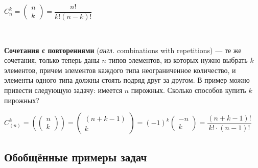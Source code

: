 \noindent $C_n^k = \begin{pmatrix} n \\ k \end{pmatrix} = \dfrac{n!}{k!(n-k)!}$

~

\textbf{Сочетания с повторениями} (\textit{англ.} combinations with repetitions) — те же сочетания, только теперь даны $n$ типов элементов, из которых нужно выбрать $k$ элементов, причем элементов каждого типа неограниченное количество, и элементы одного типа должны стоять подряд друг за другом. В пример можно привести следующую задачу: имеется $n$ пирожных. Сколько способов купить $k$ пирожных?

\noindent $C_{(n)}^k = \left( \begin{pmatrix} n \\ k \end{pmatrix} \right) = \begin{pmatrix} (n+k-1) \\ k \end{pmatrix} = (-1)^k\begin{pmatrix} -n \\ k \end{pmatrix} = \dfrac{(n+k-1)!}{k! \cdot (n-1)!}$

\begin{figure}[h]
\end{figure}

\subsection{Обобщённые примеры задач}

